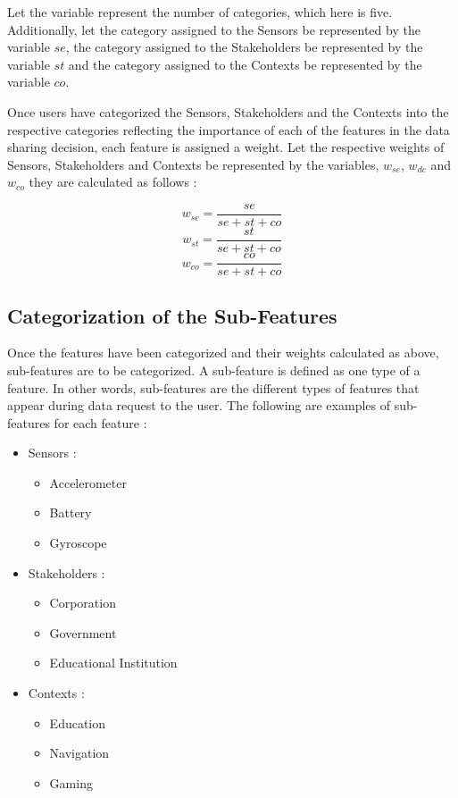 Let the variable \numcategories represent the number of categories, which here is five. Additionally, let the category assigned to the Sensors be represented by the variable $se$, the category assigned to the Stakeholders be represented by the variable $st$ and the category assigned to the Contexts be represented by the variable $co$.

Once users have categorized the Sensors, Stakeholders and the Contexts into the respective categories reflecting the importance of each of the features in the data sharing decision, each feature is assigned a weight.
Let the respective weights of Sensors, Stakeholders and Contexts be represented by the variables, $w_{se}$, $w_{dc}$ and $w_{co}$ they are calculated as follows :

\begin{equation}
   w_{se} = \frac{se}{se+st+co} 
\end{equation}
\begin{equation}
   w_{st} = \frac{st}{se+st+co}  
\end{equation}
\begin{equation}
   w_{co} = \frac{co}{se+st+co}  
\end{equation}


\subsection{Categorization of the Sub-Features}
Once the features have been categorized and their weights calculated as above, sub-features are to be categorized. A sub-feature
is defined as one type of a feature. In other words, sub-features are the different types of features that appear during data request to the user. The following are examples of sub-features for each feature :

\begin{itemize}
\item Sensors : 
\begin{itemize}
\item Accelerometer
\item  Battery
\item Gyroscope
\end{itemize} 
\item Stakeholders : 
\begin{itemize}
\item Corporation
\item  Government
\item Educational Institution
\end{itemize}
\item Contexts :
\begin{itemize}
\item Education
\item Navigation
\item Gaming
\end{itemize}
\end{itemize}

